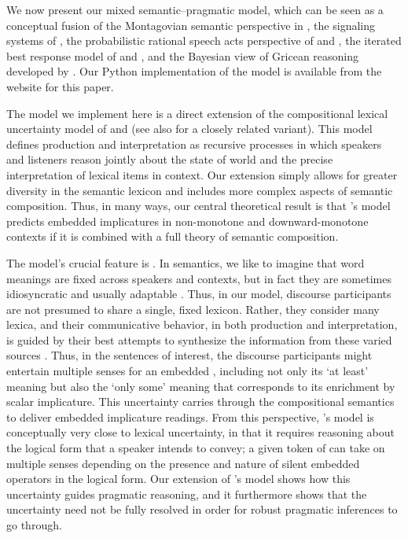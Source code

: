 \documentclass[leqno,12pt]{article}
\begin{document}
We now present our mixed semantic--pragmatic model, which can be seen
as a conceptual fusion of the Montagovian semantic perspective in
\citet{Lewis70GS}, the signaling systems of \citet{Lewis69}, the
probabilistic rational speech acts perspective of
\citet{Frank:Goodman:2012} and \citet{Goodman:Stuhlmuller:2013}, the
iterated best response model of \citet{Jaeger:2007,Jaeger:2011} and
\citet{Franke09DISS}, and the Bayesian view of Gricean reasoning
developed by \citet{Russell:2012}.  Our Python implementation of the
model is available from the website for this paper.

The model we implement here is a direct extension of the compositional
lexical uncertainty model of \citet{Bergen:Goodman:Levy:2012} and
\citet{Bergen:Levy:Goodman:2014} (see also
\citealp{lassiter-goodman:2013SALT,lassitergoodman15} for a closely related
variant). This model defines production and
interpretation as recursive processes in which speakers and listeners
reason jointly about the state of world and the precise interpretation
of lexical items in context.  Our extension simply allows for greater
diversity in the semantic lexicon and includes more complex aspects of
semantic composition. Thus, in many ways, our central theoretical
result is that \citeauthor{Bergen:Levy:Goodman:2014}'s model predicts
embedded implicatures in non-monotone and downward-monotone contexts
if it is combined with a full theory of semantic composition.


The model's crucial feature is .  In
semantics, we like to imagine that word meanings are fixed across
speakers and contexts, but in fact they are sometimes idiosyncratic
and usually adaptable \citep{clark-clark79,Clark97}. Thus, in our model, discourse
participants are not presumed to share a single, fixed
lexicon. Rather, they consider many lexica, and their communicative
behavior, in both production and interpretation, is guided by their
best attempts to synthesize the information from these varied sources
\citep{Giles:Coupland:Coupland:1991}. Thus, in the sentences of
interest, the discourse participants might entertain multiple senses
for an embedded , including not only its `at least' meaning
but also the `only some' meaning that corresponds to its enrichment by
scalar implicature. This uncertainty carries through the compositional
semantics to deliver embedded implicature readings. From this
perspective, \citeauthor{ChierchiaFoxSpector08}'s model is
conceptually very close to lexical uncertainty, in that it requires
reasoning about the logical form that a speaker intends to convey; a
given token of  can take on multiple senses depending on
the presence and nature of silent embedded operators in the logical
form. Our extension of \citeauthor{Bergen:Levy:Goodman:2014}'s model
shows how this uncertainty guides pragmatic reasoning, and it
furthermore shows that the uncertainty need not be fully resolved in
order for robust pragmatic inferences to go through.
\end{document}
